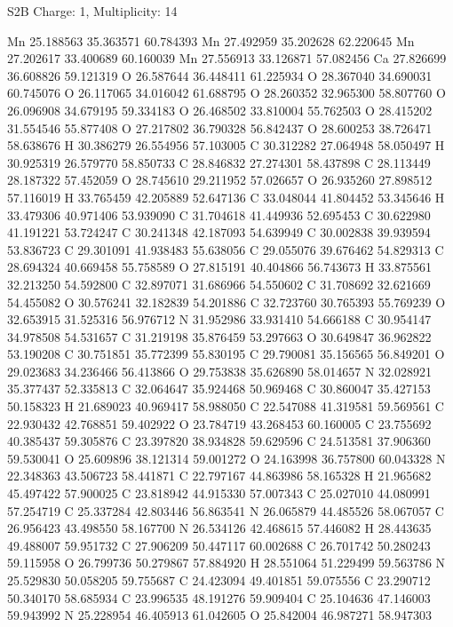 \documentclass{article}
\begin{document}
S2B   Charge: 1, Multiplicity: 14    
   
Mn 25.188563 35.363571 60.784393
Mn 27.492959 35.202628 62.220645
Mn 27.202617 33.400689 60.160039
Mn 27.556913 33.126871 57.082456
Ca 27.826699 36.608826 59.121319
O 26.587644 36.448411 61.225934
O 28.367040 34.690031 60.745076
O 26.117065 34.016042 61.688795
O 28.260352 32.965300 58.807760
O 26.096908 34.679195 59.334183
O 26.468502 33.810004 55.762503
O 28.415202 31.554546 55.877408
O 27.217802 36.790328 56.842437
O 28.600253 38.726471 58.638676
H 30.386279 26.554956 57.103005
C 30.312282 27.064948 58.050497
H 30.925319 26.579770 58.850733
C 28.846832 27.274301 58.437898
C 28.113449 28.187322 57.452059
O 28.745610 29.211952 57.026657
O 26.935260 27.898512 57.116019
H 33.765459 42.205889 52.647136
C 33.048044 41.804452 53.345646
H 33.479306 40.971406 53.939090
C 31.704618 41.449936 52.695453
C 30.622980 41.191221 53.724247
C 30.241348 42.187093 54.639949
C 30.002838 39.939594 53.836723
C 29.301091 41.938483 55.638056
C 29.055076 39.676462 54.829313
C 28.694324 40.669458 55.758589
O 27.815191 40.404866 56.743673
H 33.875561 32.213250 54.592800
C 32.897071 31.686966 54.550602
C 31.708692 32.621669 54.455082
O 30.576241 32.182839 54.201886
C 32.723760 30.765393 55.769239
O 32.653915 31.525316 56.976712
N 31.952986 33.931410 54.666188
C 30.954147 34.978508 54.531657
C 31.219198 35.876459 53.297663
O 30.649847 36.962822 53.190208
C 30.751851 35.772399 55.830195
C 29.790081 35.156565 56.849201
O 29.023683 34.236466 56.413866
O 29.753838 35.626890 58.014657
N 32.028921 35.377437 52.335813
C 32.064647 35.924468 50.969468
C 30.860047 35.427153 50.158323
H 21.689023 40.969417 58.988050
C 22.547088 41.319581 59.569561
C 22.930432 42.768851 59.402922
O 23.784719 43.268453 60.160005
C 23.755692 40.385437 59.305876
C 23.397820 38.934828 59.629596
C 24.513581 37.906360 59.530041
O 25.609896 38.121314 59.001272
O 24.163998 36.757800 60.043328
N 22.348363 43.506723 58.441871
C 22.797167 44.863986 58.165328
H 21.965682 45.497422 57.900025
C 23.818942 44.915330 57.007343
C 25.027010 44.080991 57.254719
C 25.337284 42.803446 56.863541
N 26.065879 44.485526 58.067057
C 26.956423 43.498550 58.167700
N 26.534126 42.468615 57.446082
H 28.443635 49.488007 59.951732
C 27.906209 50.447117 60.002688
C 26.701742 50.280243 59.115958
O 26.799736 50.279867 57.884920
H 28.551064 51.229499 59.563786
N 25.529830 50.058205 59.755687
C 24.423094 49.401851 59.075556
C 23.290712 50.340170 58.685934
C 23.996535 48.191276 59.909404
C 25.104636 47.146003 59.943992
N 25.228954 46.405913 61.042605
O 25.842004 46.987271 58.947303
\end{document}
